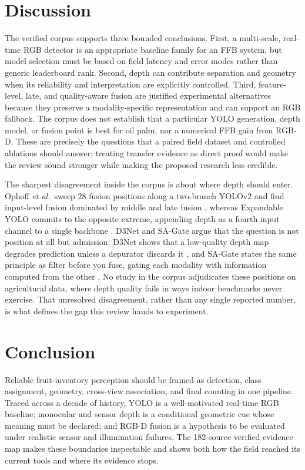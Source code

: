 \section{Discussion}

The verified corpus supports three bounded conclusions. First, a multi-scale, real-time RGB detector is an appropriate baseline family for an FFB system, but model selection must be based on field latency and error modes rather than generic leaderboard rank. Second, depth can contribute separation and geometry when its reliability and interpretation are explicitly controlled. Third, feature-level, late, and quality-aware fusion are justified experimental alternatives because they preserve a modality-specific representation and can support an RGB fallback. The corpus does not establish that a particular YOLO generation, depth model, or fusion point is best for oil palm, nor a numerical FFB gain from RGB-D. These are precisely the questions that a paired field dataset and controlled ablations should answer; treating transfer evidence as direct proof would make the review sound stronger while making the proposed research less credible.

The sharpest disagreement inside the corpus is about where depth should enter. Ophoff \textit{et al.}\ sweep 28 fusion positions along a two-branch YOLOv2 and find input-level fusion dominated by middle and late fusion \cite{ophoff2019multimodal}, whereas Expandable YOLO commits to the opposite extreme, appending depth as a fourth input channel to a single backbone \cite{takahashi2020expandableyolo}. D3Net and SA-Gate argue that the question is not position at all but admission: D3Net shows that a low-quality depth map degrades prediction unless a depurator discards it \cite{fan2020d3net}, and SA-Gate states the same principle as filter before you fuse, gating each modality with information computed from the other \cite{chen2020sagate}. No study in the corpus adjudicates these positions on agricultural data, where depth quality fails in ways indoor benchmarks never exercise. That unresolved disagreement, rather than any single reported number, is what defines the gap this review hands to experiment.

\section{Conclusion}

Reliable fruit-inventory perception should be framed as detection, class assignment, geometry, cross-view association, and final counting in one pipeline. Traced across a decade of history, YOLO is a well-motivated real-time RGB baseline; monocular and sensor depth is a conditional geometric cue whose meaning must be declared; and RGB-D fusion is a hypothesis to be evaluated under realistic sensor and illumination failures. The 182-source verified evidence map makes these boundaries inspectable and shows both how the field reached its current tools and where its evidence stops.

